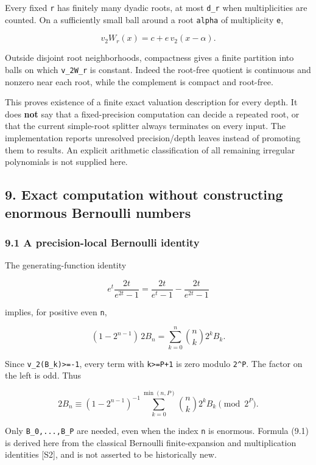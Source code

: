 \documentclass[11pt,letterpaper]{article}
\begin{document}
Every fixed \texttt{r} has finitely many dyadic roots, at most \texttt{d\_r} when multiplicities are counted. On a sufficiently small ball around a root \texttt{alpha} of multiplicity \texttt{e},

\[
v_2W_r(x)=c+e\,v_2(x-\alpha).
\]

Outside disjoint root neighborhoods, compactness gives a finite partition into balls on which \texttt{v\_2W\_r} is constant. Indeed the root-free quotient is continuous and nonzero near each root, while the complement is compact and root-free.

This proves existence of a finite exact valuation description for every depth. It does \textbf{not} say that a fixed-precision computation can decide a repeated root, or that the current simple-root splitter always terminates on every input. The implementation reports unresolved precision/depth leaves instead of promoting them to results. An explicit arithmetic classification of all remaining irregular polynomials is not supplied here.

\subsection{9. Exact computation without constructing enormous Bernoulli numbers}\label{exact-computation-without-constructing-enormous-bernoulli-numbers}

\subsubsection{9.1 A precision-local Bernoulli identity}\label{a-precision-local-bernoulli-identity}

The generating-function identity

\[
e^t\frac{2t}{e^{2t}-1}
=\frac{2t}{e^t-1}-\frac{2t}{e^{2t}-1}
\]

implies, for positive even \texttt{n},

\[
(1-2^{n-1})\,2B_n
=\sum_{k=0}^n\binom nk2^kB_k.
\]

Since \texttt{v\_2(B\_k)\textgreater{}=-1}, every term with \texttt{k\textgreater{}=P+1} is zero modulo \texttt{2\^{}P}. The factor on the left is odd. Thus

\[
\boxed{2B_n\equiv(1-2^{n-1})^{-1}
\sum_{k=0}^{\min(n,P)}\binom nk2^kB_k\pmod{2^P}.} \tag{9.1}
\]

Only \texttt{B\_0,...,B\_P} are needed, even when the index \texttt{n} is enormous. Formula (9.1) is derived here from the classical Bernoulli finite-expansion and multiplication identities {[}S2{]}, and is not asserted to be historically new.
\end{document}
